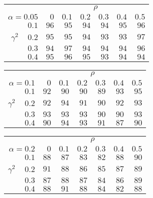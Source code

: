 \begin{tabular}{r|rrrrrr}
\hline\hline
 &\multicolumn{6}{c}{$\rho$} \\ 
 $\alpha = 0.05$ & $0$ & $0.1$ & $0.2$ & $0.3$ & $0.4$ & $0.5$ \\ 
 \hline$0.1$ & $96$ & $95$ & $94$ & $94$ & $95$ & $96$\\ 
$\gamma^2\;\;\;$ $0.2$ & $95$ & $95$ & $94$ & $93$ & $93$ & $97$\\ 
$0.3$ & $94$ & $97$ & $94$ & $94$ & $94$ & $96$\\ 
$0.4$ & $95$ & $96$ & $95$ & $93$ & $94$ & $94$\\ 
 \hline 
 \end{tabular}
 
 \vspace{2em} 
 
\begin{tabular}{r|rrrrrr}
\hline\hline
 &\multicolumn{6}{c}{$\rho$} \\ 
 $\alpha = 0.1$ & $0$ & $0.1$ & $0.2$ & $0.3$ & $0.4$ & $0.5$ \\ 
 \hline$0.1$ & $92$ & $90$ & $90$ & $89$ & $93$ & $95$\\ 
$\gamma^2\;\;\;$ $0.2$ & $92$ & $94$ & $91$ & $90$ & $92$ & $93$\\ 
$0.3$ & $93$ & $93$ & $93$ & $90$ & $90$ & $93$\\ 
$0.4$ & $90$ & $94$ & $93$ & $91$ & $87$ & $90$\\ 
 \hline 
 \end{tabular}
 
 \vspace{2em} 
 
\begin{tabular}{r|rrrrrr}
\hline\hline
 &\multicolumn{6}{c}{$\rho$} \\ 
 $\alpha = 0.2$ & $0$ & $0.1$ & $0.2$ & $0.3$ & $0.4$ & $0.5$ \\ 
 \hline$0.1$ & $88$ & $87$ & $83$ & $82$ & $88$ & $90$\\ 
$\gamma^2\;\;\;$ $0.2$ & $91$ & $88$ & $86$ & $85$ & $87$ & $89$\\ 
$0.3$ & $87$ & $88$ & $87$ & $84$ & $86$ & $89$\\ 
$0.4$ & $88$ & $91$ & $88$ & $84$ & $82$ & $88$\\ 
 \hline 
 \end{tabular}